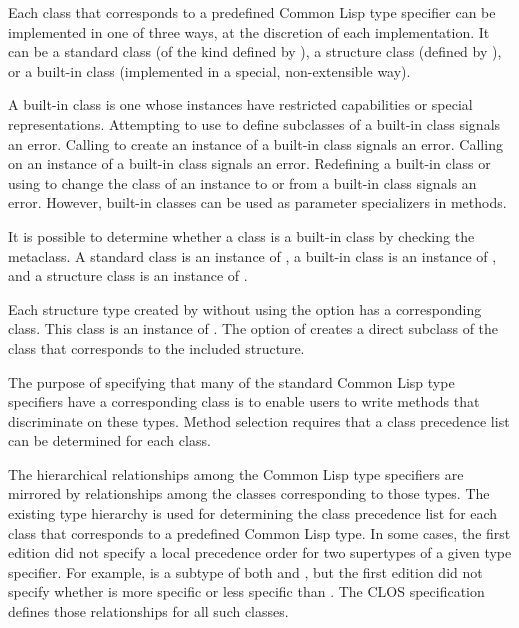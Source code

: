 Each class that corresponds to a predefined Common Lisp type specifier
can be implemented in one of three ways, at the discretion of each
implementation.  It can be a {\bit standard class\/} (of the kind
defined by ), a {\bit structure class\/} (defined
by ), or a {\bit built-in class\/} (implemented in
a special, non-extensible way).

A built-in class is one whose instances have restricted capabilities or
special representations.  Attempting to use  to define 
subclasses of a built-in class signals an error.  Calling 
 to create an instance of a built-in class signals an error.
Calling  on an instance of a built-in class signals an
error.  Redefining a built-in class or using  to change
the class of an instance to or from a built-in class signals an error.
However, built-in classes can be used as parameter specializers in
methods.


It is possible to determine whether a class is a built-in class by
checking the metaclass.  A standard class is an instance of 
, a built-in class is an instance of 
, and a structure class is an instance of 
.

Each structure type created by  without using the 
 option has a corresponding class.  This class is an instance of
.  
The  option of  creates a direct
subclass of the class that corresponds to the included structure.

The purpose of specifying that many of the standard Common Lisp type
specifiers have a corresponding class is to enable users to write methods that
discriminate on these types.  
Method selection requires that a class precedence list can be
determined for each class. 

The hierarchical relationships among the Common Lisp type specifiers
are mirrored by relationships among the classes corresponding to those
types.  The existing type hierarchy is used for determining the
class precedence list for each class that corresponds to a predefined
Common Lisp type.  In some cases, the first edition
did not specify a local precedence order for two supertypes of a
given type specifier.  For example,  is a subtype of both
 and , but the first edition
did not specify whether  is more specific or less
specific than .  The CLOS specification defines those
relationships for all such classes.


